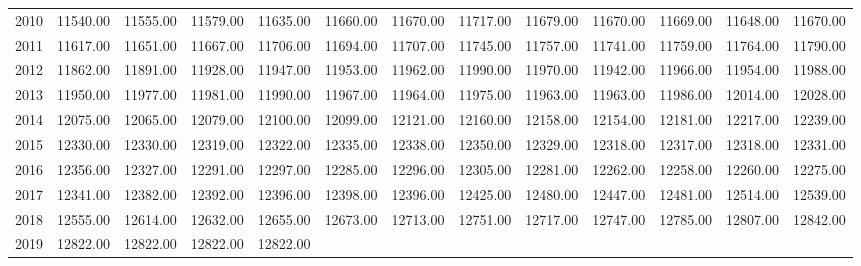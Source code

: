\begin{longtable}{rrrrrrrrrrrrr}
  2010 & 11540.00 & 11555.00 & 11579.00 & 11635.00 & 11660.00 & 11670.00 & 11717.00 & 11679.00 & 11670.00 & 11669.00 & 11648.00 & 11670.00 \\ 
  2011 & 11617.00 & 11651.00 & 11667.00 & 11706.00 & 11694.00 & 11707.00 & 11745.00 & 11757.00 & 11741.00 & 11759.00 & 11764.00 & 11790.00 \\ 
  2012 & 11862.00 & 11891.00 & 11928.00 & 11947.00 & 11953.00 & 11962.00 & 11990.00 & 11970.00 & 11942.00 & 11966.00 & 11954.00 & 11988.00 \\ 
  2013 & 11950.00 & 11977.00 & 11981.00 & 11990.00 & 11967.00 & 11964.00 & 11975.00 & 11963.00 & 11963.00 & 11986.00 & 12014.00 & 12028.00 \\ 
  2014 & 12075.00 & 12065.00 & 12079.00 & 12100.00 & 12099.00 & 12121.00 & 12160.00 & 12158.00 & 12154.00 & 12181.00 & 12217.00 & 12239.00 \\ 
  2015 & 12330.00 & 12330.00 & 12319.00 & 12322.00 & 12335.00 & 12338.00 & 12350.00 & 12329.00 & 12318.00 & 12317.00 & 12318.00 & 12331.00 \\ 
  2016 & 12356.00 & 12327.00 & 12291.00 & 12297.00 & 12285.00 & 12296.00 & 12305.00 & 12281.00 & 12262.00 & 12258.00 & 12260.00 & 12275.00 \\ 
  2017 & 12341.00 & 12382.00 & 12392.00 & 12396.00 & 12398.00 & 12396.00 & 12425.00 & 12480.00 & 12447.00 & 12481.00 & 12514.00 & 12539.00 \\ 
  2018 & 12555.00 & 12614.00 & 12632.00 & 12655.00 & 12673.00 & 12713.00 & 12751.00 & 12717.00 & 12747.00 & 12785.00 & 12807.00 & 12842.00 \\ 
  2019 & 12822.00 & 12822.00 & 12822.00 & 12822.00 &  &  &  &  &  &  &  &  \\ 
   \hline
\hline
\end{longtable}
